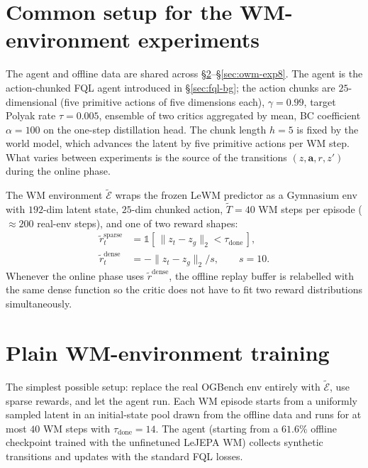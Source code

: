 \section{Common setup for the WM-environment experiments}
\label{sec:owm-setup}

The agent and offline data are shared across §\ref{sec:owm-exp1}--§\ref{sec:owm-exp8}.
The agent is the action-chunked FQL agent introduced in \S\ref{sec:fql-bg};
the action chunks are $25$-dimensional (five primitive actions of five
dimensions each), $\gamma = 0.99$, target Polyak rate $\tau = 0.005$,
ensemble of two critics aggregated by mean, BC coefficient $\alpha=100$
on the one-step distillation head. The chunk length $h=5$ is fixed by
the world model, which advances the latent by five primitive actions per
WM step. What varies between experiments is the source of the
transitions $(z, \mathbf{a}, r, z')$ during the online phase.

The WM environment $\widetilde{\mathcal{E}}$ wraps the frozen LeWM
predictor as a Gymnasium env with $192$-dim latent state, $25$-dim
chunked action, $\tilde T = 40$ WM steps per episode ($\approx 200$
real-env steps), and one of two reward shapes:
\begin{align}
    \tilde r_t^{\text{sparse}} &= \mathbb{1}\!\left[\,\|z_t - z_g\|_2 < \tau_{\text{done}}\,\right], \\
    \tilde r_t^{\text{dense}}  &= -\|z_t - z_g\|_2 / s, \qquad s = 10.
\end{align}
Whenever the online phase uses $\tilde r^{\text{dense}}$, the offline
replay buffer is relabelled with the same dense function so the critic
does not have to fit two reward distributions simultaneously.

\section{Plain WM-environment training}
\label{sec:owm-exp1}

The simplest possible setup: replace the real OGBench env entirely with
$\widetilde{\mathcal{E}}$, use sparse rewards, and let the agent run.
Each WM episode starts from a uniformly sampled latent in an
initial-state pool drawn from the offline data and runs for at most
$40$ WM steps with $\tau_{\text{done}}=14$. The agent (starting from a
$61.6\%$ offline checkpoint trained with the unfinetuned LeJEPA WM)
collects synthetic transitions and updates with the standard FQL
losses.

